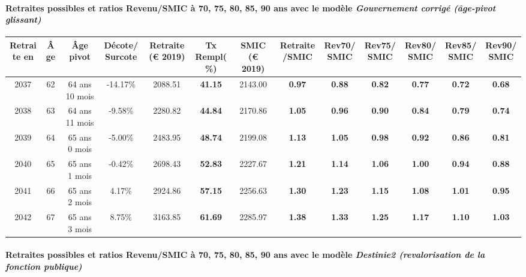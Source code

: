 \paragraph{Retraites possibles et ratios Revenu/SMIC à 70, 75, 80, 85, 90 ans avec le modèle \emph{Gouvernement corrigé (âge-pivot glissant)}}  
 
{ \scriptsize \begin{center} 
\begin{tabular}[htb]{|c|c||c|c||c|c||c||c|c|c|c|c|c|} 
\hline 
 Retraite en &  Âge &  Âge pivot &  Décote/Surcote &  Retraite (\euro{} 2019) &  Tx Rempl(\%) &  SMIC (\euro{} 2019) &  Retraite/SMIC &  Rev70/SMIC &  Rev75/SMIC &  Rev80/SMIC &  Rev85/SMIC &  Rev90/SMIC \\ 
\hline \hline 
 2037 &  62 &  64 ans 10 mois &  -14.17\% &  2088.51 &  {\bf 41.15} &  2143.00 &  {\bf {\color{red} 0.97}} &  {\bf {\color{red} 0.88}} &  {\bf {\color{red} 0.82}} &  {\bf {\color{red} 0.77}} &  {\bf {\color{red} 0.72}} &  {\bf {\color{red} 0.68}} \\ 
\hline 
 2038 &  63 &  64 ans 11 mois &  -9.58\% &  2280.82 &  {\bf 44.84} &  2170.86 &  {\bf 1.05} &  {\bf {\color{red} 0.96}} &  {\bf {\color{red} 0.90}} &  {\bf {\color{red} 0.84}} &  {\bf {\color{red} 0.79}} &  {\bf {\color{red} 0.74}} \\ 
\hline 
 2039 &  64 &  65 ans 0 mois &  -5.00\% &  2483.95 &  {\bf 48.74} &  2199.08 &  {\bf 1.13} &  {\bf 1.05} &  {\bf {\color{red} 0.98}} &  {\bf {\color{red} 0.92}} &  {\bf {\color{red} 0.86}} &  {\bf {\color{red} 0.81}} \\ 
\hline 
 2040 &  65 &  65 ans 1 mois &  -0.42\% &  2698.43 &  {\bf 52.83} &  2227.67 &  {\bf 1.21} &  {\bf 1.14} &  {\bf 1.06} &  {\bf {\color{red} 1.00}} &  {\bf {\color{red} 0.94}} &  {\bf {\color{red} 0.88}} \\ 
\hline 
 2041 &  66 &  65 ans 2 mois &  4.17\% &  2924.86 &  {\bf 57.15} &  2256.63 &  {\bf 1.30} &  {\bf 1.23} &  {\bf 1.15} &  {\bf 1.08} &  {\bf 1.01} &  {\bf {\color{red} 0.95}} \\ 
\hline 
 2042 &  67 &  65 ans 3 mois &  8.75\% &  3163.85 &  {\bf 61.69} &  2285.97 &  {\bf 1.38} &  {\bf 1.33} &  {\bf 1.25} &  {\bf 1.17} &  {\bf 1.10} &  {\bf 1.03} \\ 
\hline 
\hline 
\end{tabular} 
\end{center} } 
\paragraph{Retraites possibles et ratios Revenu/SMIC à 70, 75, 80, 85, 90 ans avec le modèle \emph{Destinie2 (revalorisation de la fonction publique)}}  
 
